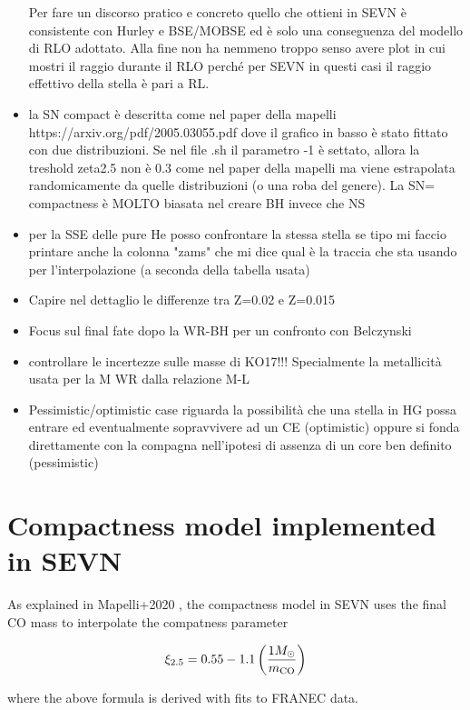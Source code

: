 \documentclass[a4paper,titlepage]{book}     	%
\newcommand{\sun}{\ensuremath{_\odot}}
\newcommand{\msun}{\ensuremath{M\sun}}
\begin{document}
\begin{itemize}
	Per fare un discorso pratico e concreto quello che ottieni in SEVN è consistente con Hurley e BSE/MOBSE ed è solo una conseguenza del modello di RLO adottato. 
	Alla fine non ha nemmeno troppo senso avere plot in cui mostri il raggio durante il RLO perché per SEVN in questi casi il raggio effettivo della stella è pari a RL. 
	\item la SN compact è descritta come nel paper della mapelli https://arxiv.org/pdf/2005.03055.pdf dove il grafico in basso è stato fittato con due distribuzioni. Se nel file .sh il parametro -1 è settato, allora la treshold zeta2.5 non è 0.3 come nel paper della mapelli ma viene estrapolata randomicamente da quelle distribuzioni (o una roba del genere). La SN= compactness è MOLTO biasata nel creare BH invece che NS
	\item per la SSE delle pure He posso confrontare la stessa stella se tipo mi faccio printare anche la colonna "zams" che mi dice qual è la traccia che sta usando per l'interpolazione (a seconda della tabella usata)
	\item Capire nel dettaglio le differenze tra Z=0.02 e Z=0.015
	\item Focus sul final fate dopo la WR-BH per un confronto con Belczynski
	\item controllare le incertezze sulle masse di KO17!!! Specialmente la metallicità usata per la M WR dalla relazione M-L
	\item Pessimistic/optimistic case riguarda la possibilità che una stella in HG possa entrare ed eventualmente sopravvivere ad un CE (optimistic) oppure si fonda direttamente con la compagna nell'ipotesi di assenza di un core ben definito (pessimistic)
\end{itemize}




\section{Compactness model implemented in SEVN}
As explained in Mapelli+2020 \cite{mapelli2020_compactness}, the compactness model in SEVN uses the final CO mass to interpolate the compatness parameter

\begin{equation}
	\xi_{2.5} = 0.55 -1.1 \left(\frac{1 \msun}{m_{\rm CO}}\right)
\end{equation}

where the above formula is derived with fits to FRANEC data.\\
\end{document}
